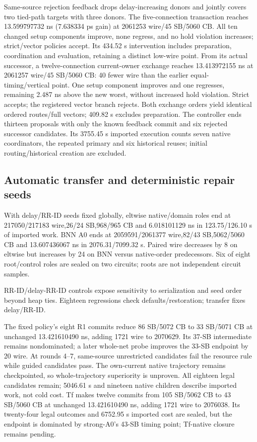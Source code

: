 \documentclass[conference,10pt]{IEEEtran}
\begin{document}
Same-source rejection feedback drops delay-increasing donors and jointly covers two tied-path targets with three donors. The five-connection transaction reaches 13.599797732 ns (7.638334 ps gain) at 2061253 wire/45 SB/5060 CB. All ten changed setup components improve, none regress, and no hold violation increases; strict/vector policies accept. Its 434.52 s intervention includes preparation, coordination and evaluation, retaining a distinct low-wire point. From its actual successor, a twelve-connection current-owner exchange reaches 13.413972155 ns at 2061257 wire/45 SB/5060 CB: 40 fewer wire than the earlier equal-timing/vertical point. One setup component improves and one regresses, remaining 2.487 ns above the new worst, without increased hold violation. Strict accepts; the registered vector branch rejects. Both exchange orders yield identical ordered routes/full vectors; 409.82 s excludes preparation. The controller ends thirteen proposals with only the known feedback commit and six rejected successor candidates. Its 3755.45 s imported execution counts seven native coordinators, the repeated primary and six historical reuses; initial routing/historical creation are excluded.

\subsection{Automatic transfer and deterministic repair seeds}
With delay/RR-ID seeds fixed globally, eltwise native/domain roles end at 217050/217183 wire,26/24 SB,968/965 CB and 6.018101129 ns in 123.75/126.10 s of imported work. BNN A0 ends at 2059591/2061377 wire,82/43 SB,5062/5060 CB and 13.607436067 ns in 2076.31/7099.32 s. Paired wire decreases by 8 on eltwise but increases by 24 on BNN versus native-order predecessors. Six of eight root/control roles are sealed on two circuits; roots are not independent circuit samples.

RR-ID/delay-RR-ID controls expose sensitivity to serialization and seed order beyond heap ties. Eighteen regressions check defaults/restoration; transfer fixes delay/RR-ID.

The fixed policy's eight R1 commits reduce 86 SB/5072 CB to 33 SB/5071 CB at unchanged 13.421610490 ns, adding 1721 wire to 2070629. Its 37-SB intermediate remains nondominated; a later whole-net probe improves the 33-SB endpoint by 20 wire. At rounds 4--7, same-source unrestricted candidates fail the resource rule while guided candidates pass. The own-current native trajectory remains checkpointed, so whole-trajectory superiority is unproven. All eighteen legal candidates remain; 5046.61 s and nineteen native children describe imported work, not cold cost. Tf makes twelve commits from 105 SB/5062 CB to 43 SB/5060 CB at unchanged 13.421610490 ns, adding 1721 wire to 2076038. Its twenty-four legal outcomes and 6752.95 s imported cost are sealed, but the endpoint is dominated by strong-A0's 43-SB timing point; Tf-native closure remains pending.
\end{document}
